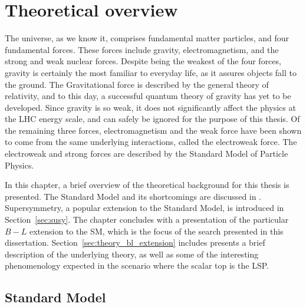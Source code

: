 \chapter[Theoretical overview][Theory]{Theoretical overview}
\label{ch:theory}

The universe, as we know it, comprises fundamental matter particles, and
four fundamental forces.
These forces include gravity, electromagnetism, and the strong and weak nuclear
forces.
Despite being the weakest of the four forces, gravity is certainly the most
familiar to everyday life, as it assures objects fall to the ground.
The Gravitational force is described by the general theory of relativity, and
to this day, a successful quantum theory of gravity has yet to be developed.
Since gravity is so weak, it does not significantly affect the physics at the
LHC energy scale, and can safely be ignored for the purpose of this thesis.
Of the remaining three forces,  electromagnetism and the weak force have been
shown to come from the same underlying interactions, called the electroweak
force.
The electroweak and strong forces are described by the Standard Model of
Particle Physics.

In this chapter, a brief overview of the theoretical background for this thesis
is presented.
The Standard Model and its shortcomings are discussed
in .
Supersymmetry, a popular extension to the Standard Model, is introduced in
Section~\ref{sec:susy}.
The chapter concludes with a presentation of the particular $B-L$ extension to
the SM, which is the focus of the search presented in this dissertation.
Section~\ref{sec:theory_bl_extension} includes presents a brief description of
the underlying theory, as well as some of the interesting phenomenology expected
in the scenario where the scalar top is the LSP.

\FloatBarrier
\section{Standard Model}
\label{sec:sm}

